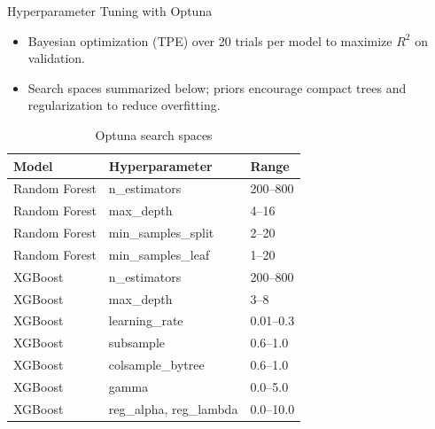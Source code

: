 \documentclass[10pt]{beamer}
\begin{document}
\begin{frame}{Hyperparameter Tuning with Optuna}
\begin{itemize}
  \item Bayesian optimization (TPE) over 20 trials per model to maximize $R^2$ on validation.
  \item Search spaces summarized below; priors encourage compact trees and regularization to reduce overfitting.
\end{itemize}
\small
\begin{table}[h]
\centering
\begin{tabular}{@{}lll@{}}
\toprule
Model & Hyperparameter & Range \\
\midrule
Random Forest & n\_estimators & 200--800 \\
Random Forest & max\_depth & 4--16 \\
Random Forest & min\_samples\_split & 2--20 \\
Random Forest & min\_samples\_leaf & 1--20 \\
XGBoost & n\_estimators & 200--800 \\
XGBoost & max\_depth & 3--8 \\
XGBoost & learning\_rate & 0.01--0.3 \\
XGBoost & subsample & 0.6--1.0 \\
XGBoost & colsample\_bytree & 0.6--1.0 \\
XGBoost & gamma & 0.0--5.0 \\
XGBoost & reg\_alpha, reg\_lambda & 0.0--10.0 \\
\bottomrule
\end{tabular}
\caption{Optuna search spaces}
\end{table}
\end{frame}
\end{document}
